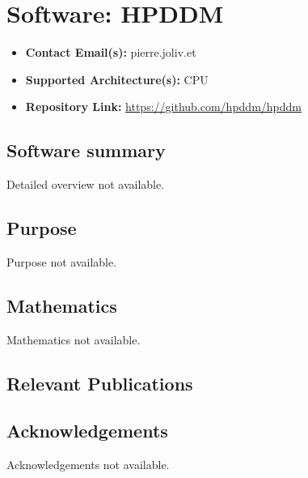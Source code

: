 \section{Software: HPDDM}
\label{sec:HPDDM:software}



\begin{itemize}
    \item \textbf{Contact Email(s):} pierre.joliv.et
    \item \textbf{Supported Architecture(s):} CPU
    \item \textbf{Repository Link:} \href{https://github.com/hpddm/hpddm}{https://github.com/hpddm/hpddm}
\end{itemize}

\subsection{Software summary}
\label{sec:HPDDM:summary}
Detailed overview not available.



\subsection{Purpose}
\label{sec:HPDDM:purpose}
Purpose not available.



\subsection{Mathematics}
\label{sec:HPDDM:mathematics}
Mathematics not available.


\subsection{Relevant Publications}
\label{sec:HPDDM:publications}

\subsection{Acknowledgements}
\label{sec::HPDDM:acknowledgements}

Acknowledgements not available.


